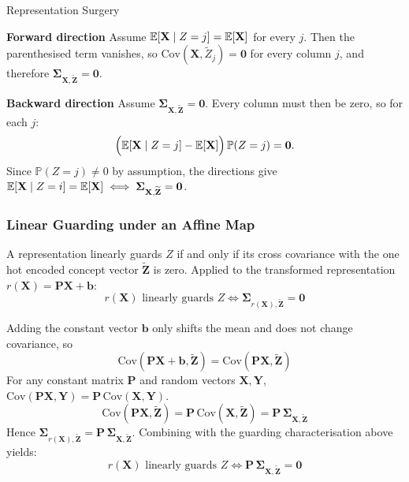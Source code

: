 \begin{question}{Representation Surgery}
\begin{subquestion}
\textbf{Forward direction} Assume $\expectation[\mathbf{X} \mid Z = j] = \expectation[\mathbf{X}]$ for every $j$. Then the parenthesised term vanishes, so $\mathrm{Cov}(\mathbf{X}, \widetilde{Z}_j) = \mathbf{0}$ for every column $j$, and therefore $\boldsymbol{\Sigma}_{\mathbf{X}, \widetilde{\mathbf{Z}}} = \mathbf{0}$.

\textbf{Backward direction} Assume $\boldsymbol{\Sigma}_{\mathbf{X}, \widetilde{\mathbf{Z}}} = \mathbf{0}$. Every column must then be zero, so for each $j$:
\begin{equation}
    \Big(\expectation[\mathbf{X} \mid Z = j] - \expectation[\mathbf{X}]\Big)\, \mathbb{P}(Z = j) = \mathbf{0}.
\end{equation}
Since $\mathbb{P}(Z = j) \neq 0$ by assumption, the directions give $\expectation[\mathbf{X} \mid Z = i] = \expectation[\mathbf{X}] \iff \boldsymbol{\Sigma}_{\mathbf{X}, \widetilde{\mathbf{Z}}} = \mathbf{0}$.

\end{subquestion}

\begin{subquestion}

\subsubsection*{Linear Guarding under an Affine Map}

A representation linearly guards $Z$ if and only if its cross covariance with the one hot encoded concept vector $\widetilde{\mathbf{Z}}$ is zero. 
Applied to the transformed representation $r(\mathbf{X}) = \mathbf{P}\mathbf{X} + \mathbf{b}$:
\begin{equation}
    r(\mathbf{X}) \text{ linearly guards } Z \iff \boldsymbol{\Sigma}_{r(\mathbf{X}), \widetilde{\mathbf{Z}}} = \mathbf{0}
\end{equation}

Adding the constant vector $\mathbf{b}$ only shifts the mean and does not change covariance, so
\begin{equation}
    \mathrm{Cov}(\mathbf{P}\mathbf{X} + \mathbf{b}, \widetilde{\mathbf{Z}}) = \mathrm{Cov}(\mathbf{P}\mathbf{X}, \widetilde{\mathbf{Z}})
\end{equation}
For any constant matrix $\mathbf{P}$ and random vectors $\mathbf{X}, \mathbf{Y}$, $\mathrm{Cov}(\mathbf{P}\mathbf{X}, \mathbf{Y}) = \mathbf{P}\, \mathrm{Cov}(\mathbf{X}, \mathbf{Y})$.
\begin{equation}
    \mathrm{Cov}(\mathbf{P}\mathbf{X}, \widetilde{\mathbf{Z}}) = \mathbf{P}\, \mathrm{Cov}(\mathbf{X}, \widetilde{\mathbf{Z}}) = \mathbf{P}\, \boldsymbol{\Sigma}_{\mathbf{X}, \widetilde{\mathbf{Z}}}
\end{equation}
Hence $\boldsymbol{\Sigma}_{r(\mathbf{X}), \widetilde{\mathbf{Z}}} = \mathbf{P}\, \boldsymbol{\Sigma}_{\mathbf{X}, \widetilde{\mathbf{Z}}}$. 
Combining with the guarding characterisation above yields:
\begin{equation}
    r(\mathbf{X}) \text{ linearly guards } Z \iff \mathbf{P}\, \boldsymbol{\Sigma}_{\mathbf{X}, \widetilde{\mathbf{Z}}} = \mathbf{0}
\end{equation}


\end{subquestion}
\end{question}
